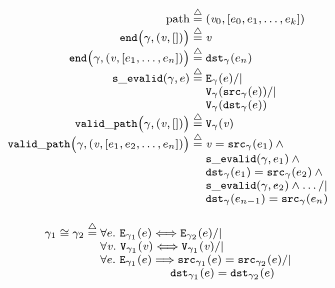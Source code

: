 \documentclass[acmsmall,screen]{acmart}
\newcommand{\defeq}{\mathbin{\stackrel{\triangle}{=}}}
\begin{document}
\begin{figure}
  \begin{minipage}{.52\textwidth}
  \begin{equation*}
  {\footnotesize
  \begin{array}{r@{}c@{}l}
    	\mathrm{path} \; &\defeq \;& (\m{v}_0, [e_0, e_1, \dots, e_k]) \\
      \mathtt{end}\big(\gamma, (\m{v}, [])\big)\;&\defeq\;& \m{v}\\
      \mathtt{end}\big(\gamma, (\m{v},[e_1,\dots,e_n])\big)\;&\defeq\;&
      \mathtt{dst}_{\gamma}(e_{n}) \\
      \mathtt{s\_evalid}(\gamma, e) \; &\defeq \;& \mathtt{E}_{\gamma}(e) /| \null \\
      &&\mathtt{V}_{\gamma}(\mathtt{src}_{\gamma}(e)) /| \null \\
      &&\mathtt{V}_{\gamma}(\mathtt{dst}_{\gamma}(e)) \\
      \mathtt{valid\_path}\big(\gamma, (\m{v},[])\big) \;&\defeq \;& \mathtt{V}_{\gamma}(\m{v})\\
      \mathtt{valid\_path}\big(\gamma, (\m{v},[e_1,e_2,\dots,e_n])\big) \; &\defeq \;& \m{v}=\mathtt{src}_{\gamma}(e_1) \wedge \null \\
      &&\mathtt{s\_evalid}(\gamma,e_1) \wedge \null \\
      &&\mathtt{dst}_{\gamma}(e_1)=\mathtt{src}_{\gamma}(e_2) \wedge \null \\
      &&\mathtt{s\_evalid}(\gamma, e_2) \wedge \dots /| \null \\
      &&\mathtt{dst}_{\gamma}(e_{n-1})=\mathtt{src}_{\gamma}(e_n)
  \end{array}}
  \end{equation*}
  \end{minipage}\begin{minipage}{.5\textwidth}
  \begin{equation*}
  {\footnotesize
  \begin{array}{r@{}c@{}l}
      \gamma_1 \cong \gamma_2 \; &\defeq\;&
        \forall e.~\mathtt{E}_{\gamma_1}(e) <=> \mathtt{E}_{\gamma_2}(e) /| \null \\
        &&\forall \m{v}.~\mathtt{V}_{\gamma_1}(\m{v}) <=> \mathtt{V}_{\gamma_1}(\m{v}) /| \null \\
        &&\forall e.~\mathtt{E}_{\gamma_1}(e) ==> \mathtt{src}_{\gamma_1}(e) = \mathtt{src}_{\gamma_2}(e) /| \null \\
        &&\hspace{5.9em} \mathtt{dst}_{\gamma_1}(e) = \mathtt{dst}_{\gamma_2}(e) \\

\end{array}}
\end{equation*}
\end{minipage}
\end{figure}
\end{document}
